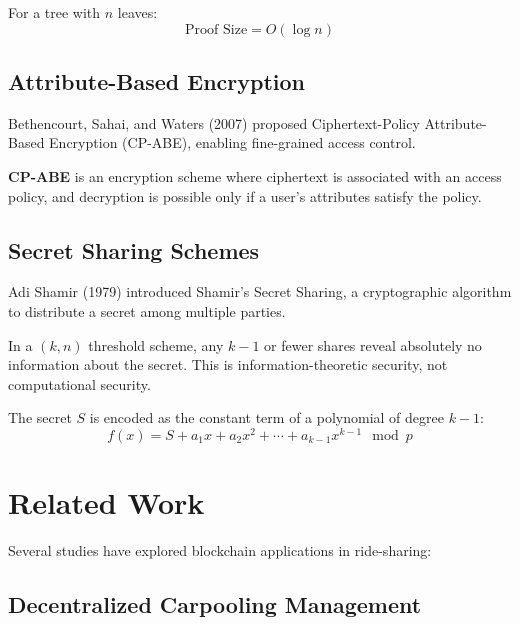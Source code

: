 For a tree with $n$ leaves:
\begin{equation}
\text{Proof Size} = O(\log n)
\end{equation}

\subsection{Attribute-Based Encryption}

Bethencourt, Sahai, and Waters (2007) proposed Ciphertext-Policy Attribute-Based Encryption (CP-ABE), enabling fine-grained access control.

\begin{definition}
\textbf{CP-ABE} is an encryption scheme where ciphertext is associated with an access policy, and decryption is possible only if a user's attributes satisfy the policy.
\end{definition}

\subsection{Secret Sharing Schemes}

Adi Shamir (1979) introduced Shamir's Secret Sharing, a cryptographic algorithm to distribute a secret among multiple parties.

\begin{theorem}
In a $(k, n)$ threshold scheme, any $k-1$ or fewer shares reveal absolutely no information about the secret. This is information-theoretic security, not computational security.
\end{theorem}

The secret $S$ is encoded as the constant term of a polynomial of degree $k-1$:
\begin{equation}
f(x) = S + a_1x + a_2x^2 + \cdots + a_{k-1}x^{k-1} \mod p
\end{equation}

\section{Related Work}

Several studies have explored blockchain applications in ride-sharing:

\subsection{Decentralized Carpooling Management}

